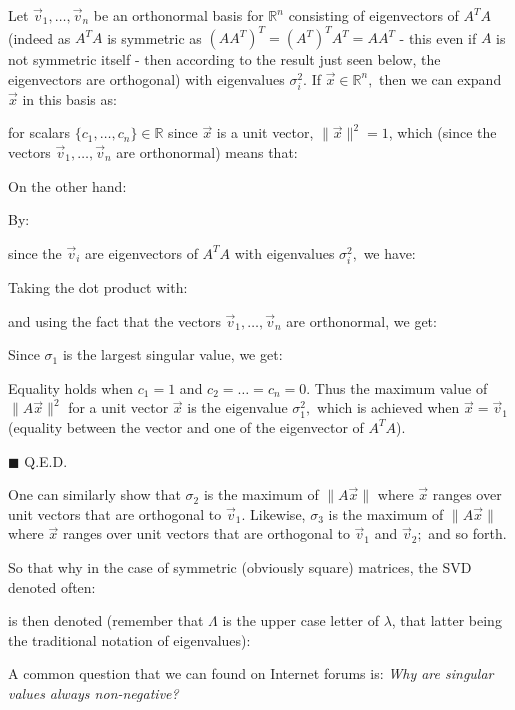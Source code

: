 	\begin{dem}
	Let $\vec{v}_{1}, \ldots, \vec{v}_{n}$ be an orthonormal basis for $\mathbb{R}^{n}$ consisting of eigenvectors of $A^{T} A$ (indeed as $A^{T} A$ is symmetric as $(AA^T)^T=(A^T)^TA^T=AA^T$ - this even if $A$ is not symmetric itself - then according to the result just seen below, the eigenvectors are orthogonal) with eigenvalues $\sigma_{i}^{2} .$ If $\vec{x} \in \mathbb{R}^{n},$ then we can expand $\vec{x}$ in this basis as:
	
	for scalars $\{c_{1}, \ldots, c_{n}\}\in \mathbb{R}$ since $\vec{x}$ is a unit vector, $\|\vec{x}\|^{2}=1$, which (since the vectors $\vec{v}_{1}, \ldots, \vec{v}_{n}$ are orthonormal) means that:
	
	On the other hand:
	
	By:
	
	since the $\vec{v}_{i}$ are eigenvectors of $A^{T} A$ with eigenvalues $\sigma_{i}^{2},$ we have:
	
	Taking the dot product with:
	
	and using the fact that the vectors $\vec{v}_{1}, \ldots, \vec{v}_{n}$ are orthonormal, we get:
	
	Since $\sigma_1$ is the largest singular value, we get:
	
	Equality holds when $c_{1}=1$ and $c_{2}=\ldots=c_{n}=0$. Thus the maximum value of $\|A \vec{x}\|^{2}$ for a unit vector $\vec{x}$ is the eigenvalue $\sigma_{1}^{2},$ which is achieved when $\vec{x}=\vec{v}_{1}$ (equality between the vector and one of the eigenvector of $A^{T} A$).
	\begin{flushright}
		$\blacksquare$  Q.E.D.
	\end{flushright}
	\end{dem}
	One can similarly show that $\sigma_{2}$ is the maximum of $\|A \vec{x}\|$ where $\vec{x}$ ranges over unit vectors that are orthogonal to $\vec{v}_{1}$. Likewise, $\sigma_{3}$ is the maximum of $\|A \vec{x}\|$ where $\vec{x}$ ranges over unit vectors that are orthogonal to $\vec{v}_{1}$ and $\vec{v}_{2} ;$ and so forth.
	
	So that why in the case of symmetric (obviously square) matrices, the SVD denoted often:
	
	is then denoted (remember that $\Lambda$ is the upper case letter of $\lambda$, that latter being the traditional notation of eigenvalues):
	
	A common question that we can found on Internet forums is: \textit{Why are singular values always non-negative?}

